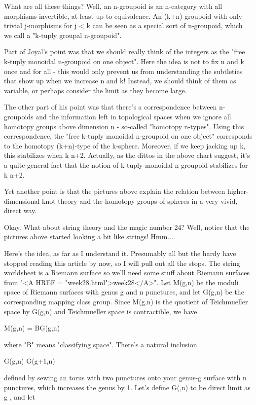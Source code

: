 What are all these things?  Well, an n-groupoid is an n-category with
all morphisms invertible, at least up to equivalence.  An (k+n)-groupoid
with only trivial j-morphisms for j < k can be seen as a special sort of
n-groupoid, which we call a "k-tuply groupal n-groupoid".  

Part of Joyal's point was that we should really think of the integers as
the "free k-tuply monoidal n-groupoid on one object".  Here the idea is
not to fix n and k once and for all - this would only prevent us from
understanding the subtleties that show up when we increase n and k!
Instead, we should think of them as variable, or perhaps consider the
limit as they become large.  

The other part of his point was that there's a correspondence between
n-groupoids and the information left in topological spaces when we
ignore all homotopy groups above dimension n - so-called "homotopy
n-types".  Using this correspondence, the "free k-tuply monoidal
n-groupoid on one object" corresponds to the homotopy (k+n)-type of the
k-sphere.  Moreover, if we keep jacking up k, this stabilizes when k \ge 
n+2.  Actually, as the dittos in the above chart suggest, it's a quite
general fact that the notion of k-tuply monoidal n-groupoid stabilizes
for k \ge  n+2.

Yet another point is that the pictures above explain the relation
between higher-dimensional knot theory and the homotopy groups of
spheres in a very vivid, direct way.

Okay.  What about string theory and the magic number 24?  Well, notice
that the pictures above started looking a bit like strings!  Hmm....

Here's the idea, as far as I understand it.  Presumably all but the
hardy have stopped reading this article by now, so I will pull out all
the stops.  The string worldsheet is a Riemann surface so we'll need
some stuff about Riemann surfaces from "<A HREF = "week28.html">week28</A>".  Let M(g,n) be the
moduli space of Riemann surfaces with genus g and n punctures, and let
G(g,n) be the corresponding mapping class group.  Since M(g,n) is the
quotient of Teichmueller space by G(g,n) and Teichmueller space is
contractible, we have 

M(g,n) = BG(g,n)

where "B" means "classifying space".  There's a
natural inclusion

G(g,n) \to  G(g+1,n)

defined by sewing an torus with two punctures onto your genus-g surface
with n punctures, which increases the genus by 1.  Let's define
G(\infty ,n) to be direct limit as g \to  \infty , and let

